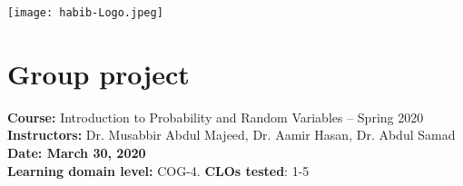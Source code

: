\documentclass[a4paper, 11pt]{article}
\begin{document}
\setlength{\parskip}{10pt}
\setlength{\parindent}{0pt}
\begin{center}
	\large
	\texttt{[image: habib-Logo.jpeg]}\\
	\section*{Group project}
	\textbf{Course:} Introduction to Probability and Random Variables -- Spring 2020\\
	\textbf{Instructors:} Dr. Musabbir Abdul Majeed, Dr. Aamir Hasan, Dr. Abdul Samad\\
	\textbf{Date: March 30, 2020}\\
	\textbf{Learning domain level:} COG-4. \textbf{CLOs tested}: 1-5\\

\end{center}
\end{document}
